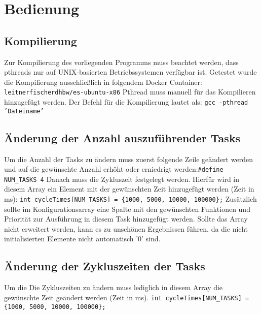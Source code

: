 \chapter{Bedienung}
\label{cha:Bedienung}

\section{Kompilierung}
Zur Kompilierung des vorliegenden Programms muss beachtet werden, dass pthreads nur auf UNIX-basierten Betriebssystemen verfügbar ist. 
Getestet wurde die Kompilierung ausschließlich in folgendem Docker Container:\newline
\texttt{leitnerfischerdhbw/es-ubuntu-x86}\newline\newline
Pthread muss manuell für das Kompilieren hinzugefügt werden. Der Befehl für die Kompilierung lautet als: \newline
\texttt{gcc -pthread  'Dateiname'}

\section{Änderung der Anzahl auszuführender Tasks}
Um die Anzahl der Tasks zu ändern muss zuerst folgende Zeile geändert werden und auf die gewünschte Anzahl erhöht oder erniedrigt werden:\newline\texttt{#define NUM_TASKS 4}\newline
Danach muss die Zykluszeit festgelegt werden. Hierfür wird in diesem Array ein Element mit der gewünschten Zeit hinzugefügt werden (Zeit in ms):
\newline\texttt{int cycleTimes[NUM_TASKS] = \{1000, 5000, 10000, 100000\};} \newline
Zusätzlich sollte im Konfigurationsarray eine Spalte mit den gewünschten Funktionen und Priorität zur Ausführung in diesem Task hinzugefügt werden. Sollte das Array nicht erweitert werden, kann es zu unschönen Ergebnissen führen, da die nicht initialisierten Elemente nicht automatisch '0' sind.  
\section{Änderung der Zykluszeiten der Tasks}
Um die Die Zykluszeiten zu ändern muss lediglich in diesem Array die gewünschte Zeit geändert werden (Zeit in ms).
\newline\texttt{int cycleTimes[NUM_TASKS] = \{1000, 5000, 10000, 100000\};} \newline

